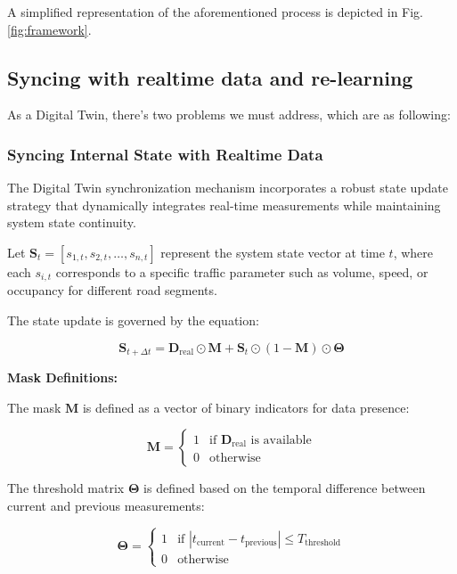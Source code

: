 A simplified representation of the aforementioned process is depicted in Fig. \ref{fig:framework}.

\subsection{\textbf{Syncing with realtime data and re-learning}}

As a Digital Twin, there's two problems we must address, which are as following:

\subsubsection{Syncing Internal State with Realtime Data}\label{subsubsec:sync}

The Digital Twin synchronization mechanism incorporates a robust state update strategy that dynamically integrates real-time measurements while maintaining system state continuity.

Let $\mathbf{S}_t = [s_{1,t}, s_{2,t}, \ldots, s_{n,t}]$ represent the system state vector at time $t$, where each $s_{i,t}$ corresponds to a specific traffic parameter such as volume, speed, or occupancy for different road segments.

The state update is governed by the equation:

\begin{equation}\label{eq:state_update}
\mathbf{S}_{t+\Delta t} = \mathbf{D}_{\text{real}} \odot \mathbf{M} + \mathbf{S}_t \odot (1 - \mathbf{M}) \odot \mathbf{\Theta}
\end{equation}

\textbf{Mask Definitions:}

The mask $\mathbf{M}$ is defined as a vector of binary indicators for data presence:

\begin{equation}
\mathbf{M} = \begin{cases} 
1 & \text{if } \mathbf{D}_{\text{real}} \text{ is available} \\
0 & \text{otherwise}
\end{cases}
\end{equation}

The threshold matrix $\mathbf{\Theta}$ is defined based on the temporal difference between current and previous measurements:

\begin{equation}
\mathbf{\Theta} = \begin{cases} 
1 & \text{if } |t_{\text{current}} - t_{\text{previous}} | \leq T_{\text{threshold}} \\
0 & \text{otherwise}
\end{cases}
\end{equation}

